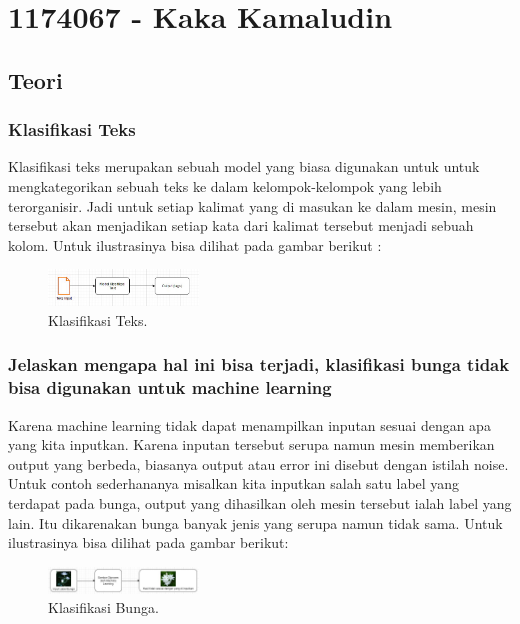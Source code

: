 \section{1174067 - Kaka Kamaludin}
\subsection{Teori}
\subsubsection{Klasifikasi Teks}
\hfill\break
Klasifikasi teks merupakan sebuah model yang biasa digunakan untuk untuk mengkategorikan sebuah teks ke dalam kelompok-kelompok yang lebih terorganisir. Jadi untuk setiap kalimat yang di masukan ke dalam mesin, mesin tersebut akan menjadikan setiap kata dari kalimat tersebut menjadi sebuah kolom. Untuk ilustrasinya bisa dilihat pada gambar berikut : 

\begin{figure}[H]
\centering
\includegraphics[width=4cm]{figures/1174067/4/1.jpg}
\caption{Klasifikasi Teks.}
\end{figure}

\subsubsection{Jelaskan mengapa hal ini bisa terjadi, klasifikasi bunga tidak bisa digunakan untuk machine learning}
\hfill\break
Karena machine learning tidak dapat menampilkan inputan sesuai dengan apa yang kita inputkan. Karena inputan tersebut serupa namun mesin memberikan output yang berbeda, biasanya output atau error ini disebut dengan istilah noise. Untuk contoh sederhananya misalkan kita inputkan salah satu label yang terdapat pada bunga, output yang dihasilkan oleh mesin tersebut ialah label yang lain. Itu dikarenakan bunga banyak jenis yang serupa namun tidak sama. Untuk ilustrasinya bisa dilihat pada gambar berikut: 

\begin{figure}[H]
\centering
\includegraphics[width=4cm]{figures/1174067/4/2.jpg}
\caption{Klasifikasi Bunga.}
\end{figure}

